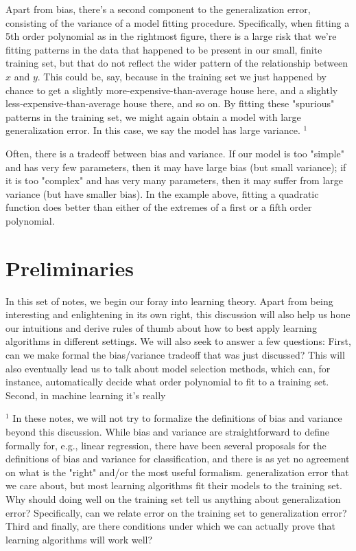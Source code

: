 \documentclass[10pt]{article}
\begin{document}
Apart from bias, there's a second component to the generalization error, consisting of the variance of a model fitting procedure. Specifically, when fitting a 5th order polynomial as in the rightmost figure, there is a large risk that we're fitting patterns in the data that happened to be present in our small, finite training set, but that do not reflect the wider pattern of the relationship between \(x\) and \(y\). This could be, say, because in the training set we just happened by chance to get a slightly more-expensive-than-average house here, and a slightly less-expensive-than-average house there, and so on. By fitting these "spurious" patterns in the training set, we might again obtain a model with large generalization error. In this case, we say the model has large variance. \({ }^{1}\)

Often, there is a tradeoff between bias and variance. If our model is too "simple" and has very few parameters, then it may have large bias (but small variance); if it is too "complex" and has very many parameters, then it may suffer from large variance (but have smaller bias). In the example above, fitting a quadratic function does better than either of the extremes of a first or a fifth order polynomial.

\section{Preliminaries}
In this set of notes, we begin our foray into learning theory. Apart from being interesting and enlightening in its own right, this discussion will also help us hone our intuitions and derive rules of thumb about how to best apply learning algorithms in different settings. We will also seek to answer a few questions: First, can we make formal the bias/variance tradeoff that was just discussed? This will also eventually lead us to talk about model selection methods, which can, for instance, automatically decide what order polynomial to fit to a training set. Second, in machine learning it's really

\({ }^{1}\) In these notes, we will not try to formalize the definitions of bias and variance beyond this discussion. While bias and variance are straightforward to define formally for, e.g., linear regression, there have been several proposals for the definitions of bias and variance for classification, and there is as yet no agreement on what is the "right" and/or the most useful formalism. generalization error that we care about, but most learning algorithms fit their models to the training set. Why should doing well on the training set tell us anything about generalization error? Specifically, can we relate error on the training set to generalization error? Third and finally, are there conditions under which we can actually prove that learning algorithms will work well?
\end{document}

